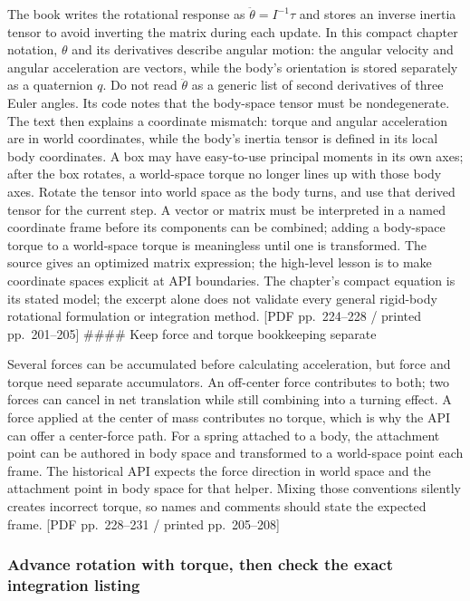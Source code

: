 The book writes the rotational response as \(\ddot{\theta}=I^{-1}\tau\) and stores an inverse inertia tensor to avoid inverting the matrix during each update. In this compact chapter notation, \(\theta\) and its derivatives describe angular motion: the angular velocity and angular acceleration are vectors, while the body's orientation is stored separately as a quaternion \(q\). Do not read \(\ddot{\theta}\) as a generic list of second derivatives of three Euler angles. Its code notes that the body-space tensor must be nondegenerate. The text then explains a coordinate mismatch: torque and angular acceleration are in world coordinates, while the body's inertia tensor is defined in its local body coordinates. A box may have easy-to-use principal moments in its own axes; after the box rotates, a world-space torque no longer lines up with those body axes. Rotate the tensor into world space as the body turns, and use that derived tensor for the current step. A vector or matrix must be interpreted in a named coordinate frame before its components can be combined; adding a body-space torque to a world-space torque is meaningless until one is transformed. The source gives an optimized matrix expression; the high-level lesson is to make coordinate spaces explicit at API boundaries. The chapter's compact equation is its stated model; the excerpt alone does not validate every general rigid-body rotational formulation or integration method. {[}PDF pp.~224--228 / printed pp.~201--205{]} \#\#\#\# Keep force and torque bookkeeping separate

Several forces can be accumulated before calculating acceleration, but force and torque need separate accumulators. An off-center force contributes to both; two forces can cancel in net translation while still combining into a turning effect. A force applied at the center of mass contributes no torque, which is why the API can offer a center-force path. For a spring attached to a body, the attachment point can be authored in body space and transformed to a world-space point each frame. The historical API expects the force direction in world space and the attachment point in body space for that helper. Mixing those conventions silently creates incorrect torque, so names and comments should state the expected frame. {[}PDF pp.~228--231 / printed pp.~205--208{]}

\subsubsection{Advance rotation with torque, then check the exact integration listing}\label{06-engine-ii-ch033-advance-rotation-with-torque-then-check-the-exact-integration-listing}

